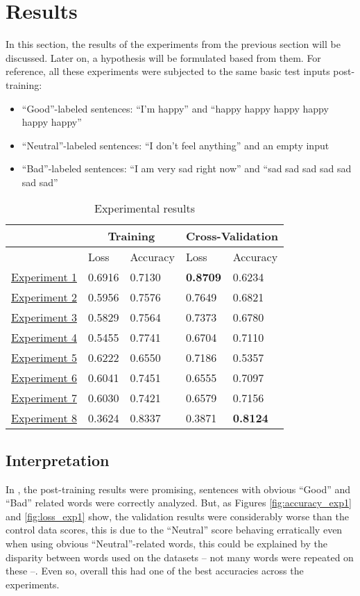 \section{Results}
In this section, the results of the experiments from the previous section will be discussed. Later on, a hypothesis will be formulated based from them. For reference, all these experiments were subjected to the same basic test inputs post-training:
\begin{itemize}
	\item ``Good''-labeled sentences: ``I'm happy'' and ``happy happy happy happy happy happy''
	\item ``Neutral''-labeled sentences: ``I don't feel anything'' and an empty input
	\item ``Bad''-labeled sentences: ``I am very sad right now'' and ``sad sad sad sad sad sad sad''
\end{itemize}
\begin{table}[!h]
	\caption{Experimental results}
	\vspace{0.5cm}
	\centering
	\begin{tabular}[t]{|l|l|l|l|l|}
	\hline
	\multicolumn{1}{|c|}{} & \multicolumn{2}{c|}{Training} & \multicolumn{2}{c|}{Cross-Validation}
	\\ \hline
	\ & Loss & Accuracy & Loss & Accuracy
	\\ \hline
	\hyperref[exp1]{Experiment 1} & 0.6916 & 0.7130 & \textbf{0.8709} & 0.6234
	\\ \hline
	\hyperref[exp2]{Experiment 2} & 0.5956 & 0.7576 & 0.7649 & 0.6821
	\\ \hline
	\hyperref[exp3]{Experiment 3} & 0.5829 & 0.7564 & 0.7373 & 0.6780
	\\ \hline
	\hyperref[exp4]{Experiment 4} & 0.5455 & 0.7741 & 0.6704 & 0.7110
	\\ \hline
	\hyperref[exp6]{Experiment 5} & 0.6222 & 0.6550 & 0.7186 & 0.5357
	\\ \hline
	\hyperref[exp7]{Experiment 6} & 0.6041 & 0.7451 & 0.6555 & 0.7097
	\\ \hline
	\hyperref[exp8]{Experiment 7} & 0.6030 & 0.7421 & 0.6579 & 0.7156
	\\ \hline
	\hyperref[exp9]{Experiment 8} & 0.3624 & 0.8337 & 0.3871 & \textbf{0.8124}
	\\ \hline
	\end{tabular}
\end{table}
\pagebreak
\subsection{Interpretation}
In , the post-training results were promising, sentences with obvious ``Good'' and ``Bad'' related words were correctly analyzed. But, as Figures \ref{fig:accuracy_exp1} and \ref{fig:loss_exp1} show, the validation results were considerably worse than the control data scores, this is due to the ``Neutral'' score behaving erratically even when using obvious ``Neutral''-related words, this could be explained by the disparity between words used on the datasets -- not many words were repeated on these --. Even so, overall this had one of the best accuracies across the experiments.

